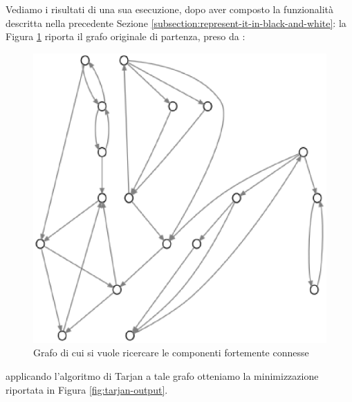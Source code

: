 Vediamo i risultati di una sua esecuzione, dopo aver composto la
funzionalit\`a descritta nella precedente Sezione
\ref{subsection:represent-it-in-black-and-white}: la Figura
\ref{fig:before-applying-tarjan} riporta il grafo originale di
partenza, preso da \cite{Algoritmica}:
\begin{figure}
  \centering
  \includegraphics{images/OnePipingLevelUnitTest_Printer_DFS_PrinterPipe_Crescenzi-phase-PrinterPipeFilter-level-0.eps}
  \caption{Grafo di cui si vuole ricercare le componenti fortemente
    connesse}
  \label{fig:before-applying-tarjan}
\end{figure}
applicando l'algoritmo di Tarjan a tale grafo otteniamo la
minimizzazione riportata in Figura \ref{fig:tarjan-output}.
